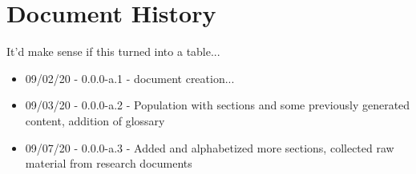 \chapter{Document History}
It'd make sense if this turned into a table...

\begin{itemize}
\item 09/02/20 -  0.0.0-a.1 - document creation...
\item 09/03/20 -  0.0.0-a.2 - Population with sections and some previously generated content, addition of glossary
\item 09/07/20 - 0.0.0-a.3 - Added and alphabetized more sections, collected raw material from research documents
\end{itemize}